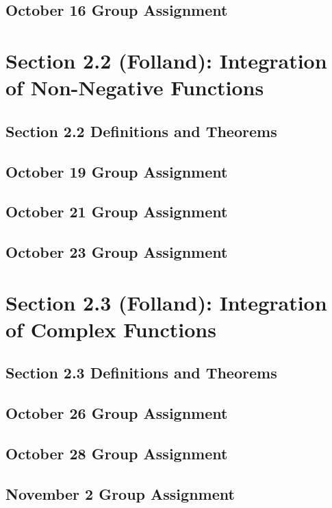 \documentclass[11pt]{amsart}
\begin{document}
\subsection{October 16 Group Assignment}

\section{Section 2.2 (Folland): Integration of Non-Negative Functions}
\subsection{Section 2.2 Definitions and Theorems}
 
  
\subsection{October 19 Group Assignment}


\subsection{October 21 Group Assignment}


\subsection{October 23 Group Assignment}

\section{Section 2.3 (Folland): Integration of Complex Functions}
\subsection{Section 2.3 Definitions and Theorems}
   
\subsection{October 26 Group Assignment}


\subsection{October 28 Group Assignment}


\subsection{November 2 Group Assignment}
 
\end{document}
